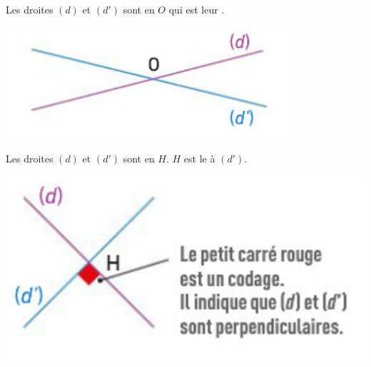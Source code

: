 \documentclass[12pt,a4paper]{article}
\date{}
\title{}
\begin{document}




\begin{myex}
	\begin{multicols}{2}
		Les droites $(d)$ et $(d')$ sont \hspace*{4cm} en $O$ qui est leur \hspace*{8cm}.
		
		\includegraphics[scale=0.5]{img/sec}
	\end{multicols}
	
\end{myex}



\begin{myex}
	\begin{multicols}{2}
		Les droites $(d)$ et $(d')$ sont \hspace*{6cm} en $H$. $H$ est le \hspace*{8cm} à $(d')$.
		
		\includegraphics[scale=0.6]{img/perp}
	\end{multicols}
	
\end{myex}
\end{document}

